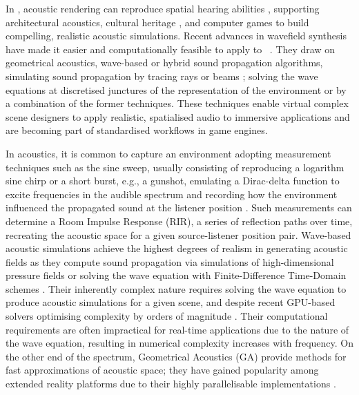 In , acoustic rendering can reproduce spatial hearing abilities \citep{lokki2005navigation}, supporting architectural acoustics, cultural heritage \citep{berardi2016acoustic, vorlander2015virtual}, and computer games \citep{raghuvanshi2014parametric, mehra2015wave} to build compelling, realistic acoustic simulations. Recent advances in wavefield synthesis have made it easier and computationally feasible to apply to ~\citep{raghuvanshi2014parametric}. They draw on geometrical acoustics, wave-based or hybrid sound propagation algorithms, simulating sound propagation by tracing rays or beams \citep{hulusic2012acoustic}; solving the wave equations at discretised junctures of the representation of the environment or by a combination of the former techniques. These techniques enable virtual complex scene designers to apply realistic, spatialised audio to immersive applications and are becoming part of standardised workflows in game engines.\par
In acoustics, it is common to capture an environment adopting measurement techniques such as the sine sweep, usually consisting of reproducing a logarithm sine chirp or a short burst, e.g., a gunshot,  emulating a Dirac-delta function to excite frequencies in the audible spectrum and recording how the environment influenced the propagated sound at the listener position \cite{reilly1995convolution}. Such measurements can determine a Room Impulse Response (RIR), a series of reflection paths over time, recreating the acoustic space for a given source-listener position pair. Wave-based acoustic simulations achieve the highest degrees of realism in generating acoustic fields as they compute sound propagation via simulations of high-dimensional pressure fields \cite{raghuvanshi2014parametric} or solving the wave equation with Finite-Difference Time-Domain schemes \cite{hamilton2017fdtd}. Their inherently complex nature requires solving the wave equation to produce acoustic simulations for a given scene, and despite recent GPU-based solvers optimising complexity by orders of magnitude \cite{mehra2012efficient}. Their computational requirements are often impractical for real-time applications due to the nature of the wave equation, resulting in numerical complexity increases with frequency. On the other end of the spectrum, Geometrical Acoustics (GA) provide methods for fast approximations of acoustic space; they have gained popularity among extended reality platforms due to their highly parallelisable implementations \cite{savioja2015overview}.\par
